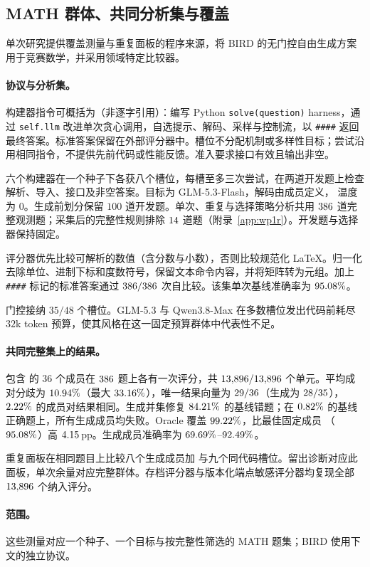 \subsection{MATH 群体、共同分析集与覆盖}\label{app:crossdomain}
单次研究提供覆盖测量与重复面板的程序来源，将 BIRD 的无门控自由生成方案用于竞赛数学，并采用领域特定比较器。

\paragraph{协议与分析集。}
\label{app:builder-instruction}
构建器指令可概括为（非逐字引用）：编写 Python \texttt{solve(question)} harness，通过 \texttt{self.llm} 改进单次贪心调用，自选提示、解码、采样与控制流，以 \texttt{\#\#\#\#} 返回最终答案。标准答案保留在外部评分器中。槽位不分配机制或多样性目标；尝试沿用相同指令，不提供先前代码或性能反馈。准入要求接口有效且输出非空。

六个构建器在一个种子下各获八个槽位，每槽至多三次尝试，在两道开发题上检查解析、导入、接口及非空答案。目标为 GLM-5.3-Flash，解码由成员定义，\bare{} 温度为 $0$。生成前划分保留 $100$ 道开发题。单次、重复与选择策略分析共用 $386$ 道完整观测题；采集后的完整性规则排除 $14$ 道题（附录~\ref{app:wp1r}）。开发题与选择器保持固定。

评分器优先比较可解析的数值（含分数与小数），否则比较规范化 LaTeX。归一化去除单位、进制下标和度数符号，保留文本命令内容，并将矩阵转为元组。加上 \texttt{\#\#\#\#} 标记的标准答案通过 $386/386$ 次自比较。该集单次基线准确率为 $95.08\%$。

门控接纳 $35/48$ 个槽位。GLM-5.3 与 Qwen3.8-Max 在多数槽位发出代码前耗尽 $32$k token 预算，使其风格在这一固定预算群体中代表性不足。

\paragraph{共同完整集上的结果。}
包含 \bare{} 的 $36$ 个成员在 $386$ 题上各有一次评分，共 $13{,}896/13{,}896$ 个单元。平均成对分歧为 $10.94\%$（最大 $33.16\%$），唯一结果向量为 $29/36$（生成为 $28/35$），$2.22\%$ 的成员对结果相同。生成并集修复 $84.21\%$ 的基线错题；在 $0.82\%$ 的基线正确题上，所有生成成员均失败。Oracle 覆盖 $99.22\%$，比最佳固定成员 \bare{}（$95.08\%$）高 $4.15$\,pp。生成成员准确率为 $69.69\%$--$92.49\%$。

重复面板在相同题目上比较八个生成成员加 \bare{} 与九个同代码槽位。留出诊断对应此面板，单次余量对应完整群体。存档评分器与版本化端点敏感评分器均复现全部 $13{,}896$ 个纳入评分。

\paragraph{范围。}
这些测量对应一个种子、一个目标与按完整性筛选的 MATH 题集；BIRD 使用下文的独立协议。
